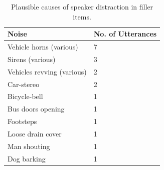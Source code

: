 \documentclass[man]{apa6}
\begin{document}
\begin{table}
\begin{tabularx}{\linewidth}{|X|X|}
\hline
Noise & No. of Utterances\\
\hline
Vehicle horns (various) & 7 \\
Sirens (various) & 3 \\
Vehicles revving (various) & 2 \\
Car-stereo & 2 \\
Bicycle-bell & 1 \\
Bus doors opening & 1 \\
Footsteps & 1 \\
Loose drain cover & 1 \\
Man shouting & 1 \\
Dog barking & 1 \\
\hline
\end{tabularx}
\caption{Plausible causes of speaker distraction in filler items.}
\label{table:fillernoise}
\end{table}
\end{document}
